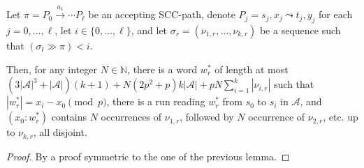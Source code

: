 \documentclass[letterpaper, USenglish, cleveref, autoref, thm-restate, numberwithinsect]{lipics-v2021}
\theoremstyle{theorem}
\theoremstyle{definition}
\newcommand{\Aa}{\mathcal{A}}
\newcommand{\curly}{\mathrel{\leadsto}}
\newcommand{\lefteffect}[2]{(#1 \gg #2)}
\newcommand{\NN}{\mathbb{N}}
\newcommand{\portal}[4]{#1,#2 \curly #3, #4}
\newcommand{\SCCpath}{\pi}
\newcommand{\set}[1]{\{ #1 \}}
\newcommand{\timedword}[2]{(#1:#2)}
\begin{document}
\begin{lemma}
	\label{lem:seq-right}
	Let $\SCCpath = P_0 \xrightarrow{a_1} \cdots  P_\ell$ be an accepting SCC-path,
	denote $P_j = \portal{s_j}{x_j}{t_j}{y_j}$ for each $j = 0,\ldots,\ell$,
	let $i \in \set{0, \ldots, \ell}$,
	and let $\sigma_r = (\nu_{1,r}, \ldots, \nu_{k,r})$ be a sequence such that $\lefteffect{\sigma_l}{\SCCpath} < i$.

	Then, for any integer $N \in \NN$, there is a word $w_r^*$ of length at most $(3|\Aa|^3+|\Aa|)(k+1)  + N(2p^2+p)k|\Aa| + pN\sum_{i=1}^k|\nu_{i,r}|$ such that $|w_r^*| = x_i-x_0 \pmod{p}$, there is a run reading $w_r^*$ from $s_0$ to $s_i$ in $\Aa$, and $\timedword{x_0}{w_r^*}$ contains $N$ occurrences of $\nu_{1,r}$, followed by $N$ occurrence of $\nu_{2,r}$, etc. up to $\nu_{k,r}$, all disjoint.
\end{lemma}
\begin{proof}
	By a proof symmetric to the one of the previous lemma.
\end{proof}
\end{document}
